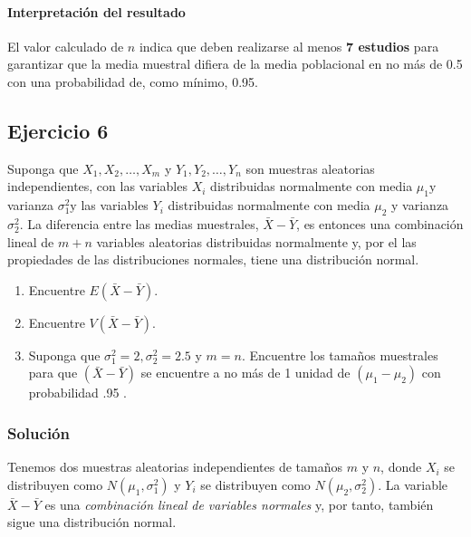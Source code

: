 \documentclass[
]{article}
\providecommand{\tightlist}{%
  \setlength{\itemsep}{0pt}\setlength{\parskip}{0pt}}
\begin{document}
\paragraph{Interpretación del resultado}\label{interpretaciuxf3n-del-resultado-2}

El valor calculado de \(n\) indica que deben realizarse al menos \textbf{7 estudios} para garantizar que la media muestral difiera de la media poblacional en no más de 0.5 con una probabilidad de, como mínimo, 0.95.

\subsection{Ejercicio 6}\label{ejercicio-6-1}

Suponga que \(X_{1}, X_{2}, \ldots, X_{m}\) y \(Y_{1}, Y_{2}, \ldots, Y_{n}\) son muestras aleatorias independientes, con las variables \(X_{i}\) distribuidas normalmente con media \(\mu_{1} \mathrm{y}\) varianza \(\sigma_{1}^{2} \mathrm{y}\) las variables \(Y_{i}\) distribuidas normalmente con media \(\mu_{2}\) y varianza \(\sigma_{2}^{2}\). La diferencia entre las medias muestrales, \(\bar{X}-\bar{Y}\), es entonces una combinación lineal de \(m+n\) variables aleatorias distribuidas normalmente y, por el las propiedades de las distribuciones normales, tiene una distribución normal.

\begin{enumerate}
\def\labelenumi{\alph{enumi}.}
\tightlist
\item
  Encuentre \(E(\bar{X}-\bar{Y})\).
\item
  Encuentre \(V(\bar{X}-\bar{Y})\).
\item
  Suponga que \(\sigma_{1}^{2}=2, \sigma_{2}^{2}=2.5\) y \(m=n\). Encuentre los tamaños muestrales para que \((\bar{X}-\bar{Y})\) se encuentre a no más de 1 unidad de \(\left(\mu_{1}-\mu_{2}\right)\) con probabilidad .95 .
\end{enumerate}

\subsubsection{Solución}\label{soluciuxf3n-9}

Tenemos dos muestras aleatorias independientes de tamaños \(m\) y \(n\), donde \(X_i\) se distribuyen como \(N(\mu_1, \sigma_1^2)\) y \(Y_i\) se distribuyen como \(N(\mu_2, \sigma_2^2)\). La variable \(\bar{X} - \bar{Y}\) es una \emph{combinación lineal de variables normales} y, por tanto, también sigue una distribución normal.
\end{document}
